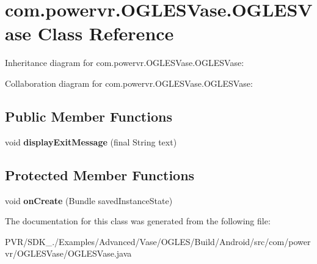 \hypertarget{classcom_1_1powervr_1_1_o_g_l_e_s_vase_1_1_o_g_l_e_s_vase}{\section{com.\+powervr.\+O\+G\+L\+E\+S\+Vase.\+O\+G\+L\+E\+S\+Vase Class Reference}
\label{classcom_1_1powervr_1_1_o_g_l_e_s_vase_1_1_o_g_l_e_s_vase}
}


Inheritance diagram for com.\+powervr.\+O\+G\+L\+E\+S\+Vase.\+O\+G\+L\+E\+S\+Vase\+:


Collaboration diagram for com.\+powervr.\+O\+G\+L\+E\+S\+Vase.\+O\+G\+L\+E\+S\+Vase\+:
\subsection*{Public Member Functions}
\begin{DoxyCompactItemize}
\item 
\hypertarget{classcom_1_1powervr_1_1_o_g_l_e_s_vase_1_1_o_g_l_e_s_vase_ae36ca4061f6a941edb2ef3bb5a30cd66}{void {\bfseries display\+Exit\+Message} (final String text)}\label{classcom_1_1powervr_1_1_o_g_l_e_s_vase_1_1_o_g_l_e_s_vase_ae36ca4061f6a941edb2ef3bb5a30cd66}

\end{DoxyCompactItemize}
\subsection*{Protected Member Functions}
\begin{DoxyCompactItemize}
\item 
\hypertarget{classcom_1_1powervr_1_1_o_g_l_e_s_vase_1_1_o_g_l_e_s_vase_ab4876401be8080f13fe067acd6618d5b}{void {\bfseries on\+Create} (Bundle saved\+Instance\+State)}\label{classcom_1_1powervr_1_1_o_g_l_e_s_vase_1_1_o_g_l_e_s_vase_ab4876401be8080f13fe067acd6618d5b}

\end{DoxyCompactItemize}


The documentation for this class was generated from the following file\+:\begin{DoxyCompactItemize}
\item 
P\+V\+R/\+S\+D\+K\+\_./\+Examples/\+Advanced/\+Vase/\+O\+G\+L\+E\+S/\+Build/\+Android/src/com/powervr/\+O\+G\+L\+E\+S\+Vase/O\+G\+L\+E\+S\+Vase.\+java\end{DoxyCompactItemize}
